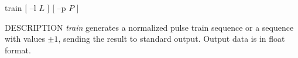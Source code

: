 % 
% 
% 
% 
%                                                                        
%
\hypertarget{train}{}

\begin{synopsis}
\item[train] [ --l $L$ ] [ --p $P$ ]
\end{synopsis}

\begin{qsection}{DESCRIPTION}
{\em train} generates a normalized pulse train sequence 
or a sequence with values $\pm 1$, 
sending the result to standard output.
Output data is in float format.
\end{qsection}

